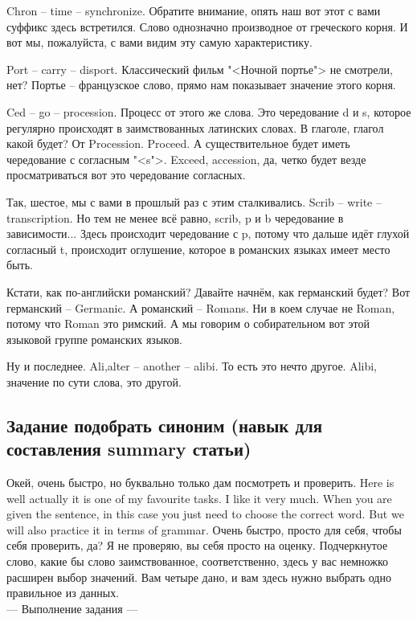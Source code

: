 \documentclass[main.tex]{subfiles}
\begin{document}
Chron -- time -- synchronize.
Обратите внимание, опять наш вот этот с вами суффикс здесь встретился.
Слово однозначно производное от греческого корня.
И вот мы, пожалуйста, с вами видим эту самую характеристику.

Port -- carry -- disport.
Классический фильм "<Ночной портье"> не смотрели, нет?
Портье -- французское слово, прямо нам показывает значение этого корня.

Ced -- go -- procession.
Процесс от этого же слова.
Это чередование d и s, которое регулярно происходят в заимствованных латинских словах.
В глаголе, глагол какой будет? От Procession.
Proceed.
А существительное будет иметь чередование с согласным "<s">.
Exceed, accession, да, четко будет везде просматриваться вот это чередование согласных.


Так, шестое, мы с вами в прошлый раз с этим сталкивались.
Scrib -- write -- transcription.
Но тем не менее всё равно, scrib, p и b чередование в зависимости...
Здесь происходит чередование с p, потому что дальше идёт глухой согласный t, происходит оглушение, которое в романских языках имеет место быть.

Кстати, как по-английски романский?
Давайте начнём, как германский будет?
Вот германский -- Germanic.
А романский -- Romans.
Ни в коем случае не Roman, потому что Roman это римский.
А мы говорим о собирательном вот этой языковой группе романских языков.

Ну и последнее.
Ali,alter -- another -- alibi.
То есть это нечто другое.
Alibi, значение по сути слова, это другой.

\subsection{Задание подобрать синоним (навык для составления summary статьи)}

Окей, очень быстро, но буквально только дам посмотреть и проверить.
Here is well actually it is one of my favourite tasks.
I like it very much.
When you are given the sentence, in this case you just need to choose the correct word.
But we will also practice it in terms of grammar.
Очень быстро, просто для себя, чтобы себя проверить, да?
Я не проверяю, вы себя просто на оценку.
Подчеркнутое слово, какие бы слово заимствованное, соответственно, здесь у вас немножко расширен выбор значений.
Вам четыре дано, и вам здесь нужно выбрать одно правильное из данных.
\\

--- Выполнение задания ---
\\
\end{document}
